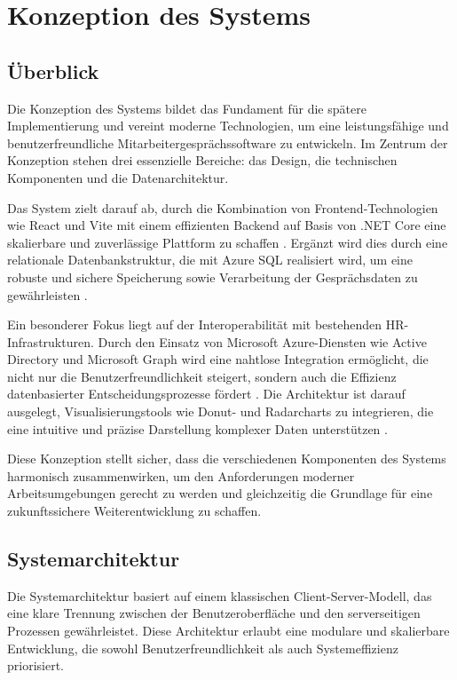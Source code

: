 \chapter{Konzeption des Systems}
\label{chap:konzeption}

\section{\"Uberblick}
Die Konzeption des Systems bildet das Fundament für die spätere Implementierung und vereint moderne Technologien, um eine leistungsfähige und benutzerfreundliche Mitarbeitergesprächssoftware zu entwickeln. Im Zentrum der Konzeption stehen drei essenzielle Bereiche: das Design, die technischen Komponenten und die Datenarchitektur.

Das System zielt darauf ab, durch die Kombination von Frontend-Technologien wie React und Vite mit einem effizienten Backend auf Basis von .NET Core eine skalierbare und zuverlässige Plattform zu schaffen \cite{kirk2016data, microsoftDotNet}. Ergänzt wird dies durch eine relationale Datenbankstruktur, die mit Azure SQL realisiert wird, um eine robuste und sichere Speicherung sowie Verarbeitung der Gesprächsdaten zu gewährleisten \cite{azureDocumentation}.

Ein besonderer Fokus liegt auf der Interoperabilität mit bestehenden HR-Infrastrukturen. Durch den Einsatz von Microsoft Azure-Diensten wie Active Directory und Microsoft Graph wird eine nahtlose Integration ermöglicht, die nicht nur die Benutzerfreundlichkeit steigert, sondern auch die Effizienz datenbasierter Entscheidungsprozesse fördert \cite{microsoftAzure}. Die Architektur ist darauf ausgelegt, Visualisierungstools wie Donut- und Radarcharts zu integrieren, die eine intuitive und präzise Darstellung komplexer Daten unterstützen \cite{evergreen2016effective}.

Diese Konzeption stellt sicher, dass die verschiedenen Komponenten des Systems harmonisch zusammenwirken, um den Anforderungen moderner Arbeitsumgebungen gerecht zu werden und gleichzeitig die Grundlage für eine zukunftssichere Weiterentwicklung zu schaffen.


\section{Systemarchitektur}
Die Systemarchitektur basiert auf einem klassischen Client-Server-Modell, das eine klare Trennung zwischen der Benutzeroberfläche und den serverseitigen Prozessen gewährleistet. Diese Architektur erlaubt eine modulare und skalierbare Entwicklung, die sowohl Benutzerfreundlichkeit als auch Systemeffizienz priorisiert.

